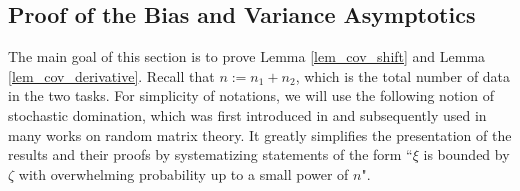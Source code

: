 \subsection{Proof of the Bias and Variance Asymptotics}\label{appendix RMT}

The main goal of this section is to prove Lemma \ref{lem_cov_shift} and Lemma \ref{lem_cov_derivative}. Recall that $n:=n_1+n_2$, which is the total number of data in the two tasks. 
%
For simplicity of notations, we will use the following notion of stochastic domination, which was first introduced in \cite{Average_fluc} and subsequently used in many works on random matrix theory. It greatly simplifies the presentation of the results and their proofs by systematizing statements of the form ``$\xi$ is bounded by $\zeta$ with overwhelming probability up to a small power of $n$".

